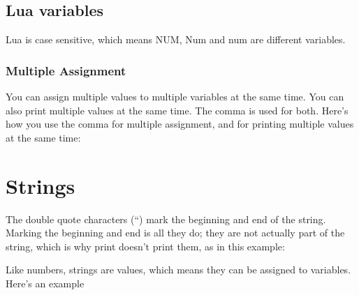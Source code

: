\documentclass{tufte-book}
\begin{document}
\section{Lua variables}

\begin{tcblisting}{}
\end{tcblisting}

Lua is case sensitive, which means NUM, Num and num are different variables.

\begin{tcblisting}{}
\end{tcblisting}

\subsection{Multiple Assignment}
You can assign multiple values to multiple variables at the same time. You can also print multiple values
at the same time. The comma is used for both. Here’s how you use the comma for multiple assignment,
and for printing multiple values at the same time:

\begin{tcblisting}{}
\end{tcblisting}



\chapter{Strings}
The double quote characters (“) mark the beginning and end of the string. Marking the beginning and
end is all they do; they are not actually part of the string, which is why print doesn’t print them, as in
this example:

\begin{tcblisting}{}
\end{tcblisting}

Like numbers, strings are values, which means they can be assigned to variables. Here's an example
\begin{tcblisting}{}
\end{tcblisting}
\end{document}
